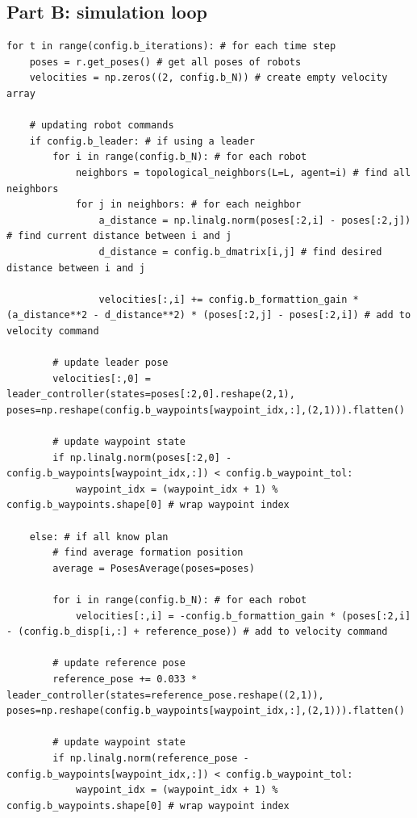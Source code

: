 \documentclass[11pt]{article}
\begin{document}
\clearpage
\subsection{Part B: simulation loop}
\begin{verbatim}
for t in range(config.b_iterations): # for each time step
    poses = r.get_poses() # get all poses of robots
    velocities = np.zeros((2, config.b_N)) # create empty velocity array

    # updating robot commands
    if config.b_leader: # if using a leader
        for i in range(config.b_N): # for each robot
            neighbors = topological_neighbors(L=L, agent=i) # find all neighbors
            for j in neighbors: # for each neighbor
                a_distance = np.linalg.norm(poses[:2,i] - poses[:2,j]) # find current distance between i and j
                d_distance = config.b_dmatrix[i,j] # find desired distance between i and j

                velocities[:,i] += config.b_formattion_gain * (a_distance**2 - d_distance**2) * (poses[:2,j] - poses[:2,i]) # add to velocity command
    
        # update leader pose
        velocities[:,0] = leader_controller(states=poses[:2,0].reshape(2,1), poses=np.reshape(config.b_waypoints[waypoint_idx,:],(2,1))).flatten()

        # update waypoint state
        if np.linalg.norm(poses[:2,0] - config.b_waypoints[waypoint_idx,:]) < config.b_waypoint_tol:
            waypoint_idx = (waypoint_idx + 1) % config.b_waypoints.shape[0] # wrap waypoint index
    
    else: # if all know plan
        # find average formation position
        average = PosesAverage(poses=poses)

        for i in range(config.b_N): # for each robot
            velocities[:,i] = -config.b_formattion_gain * (poses[:2,i] - (config.b_disp[i,:] + reference_pose)) # add to velocity command

        # update reference pose
        reference_pose += 0.033 * leader_controller(states=reference_pose.reshape((2,1)), poses=np.reshape(config.b_waypoints[waypoint_idx,:],(2,1))).flatten()

        # update waypoint state
        if np.linalg.norm(reference_pose - config.b_waypoints[waypoint_idx,:]) < config.b_waypoint_tol:
            waypoint_idx = (waypoint_idx + 1) % config.b_waypoints.shape[0] # wrap waypoint index


\end{verbatim}
\end{document}
